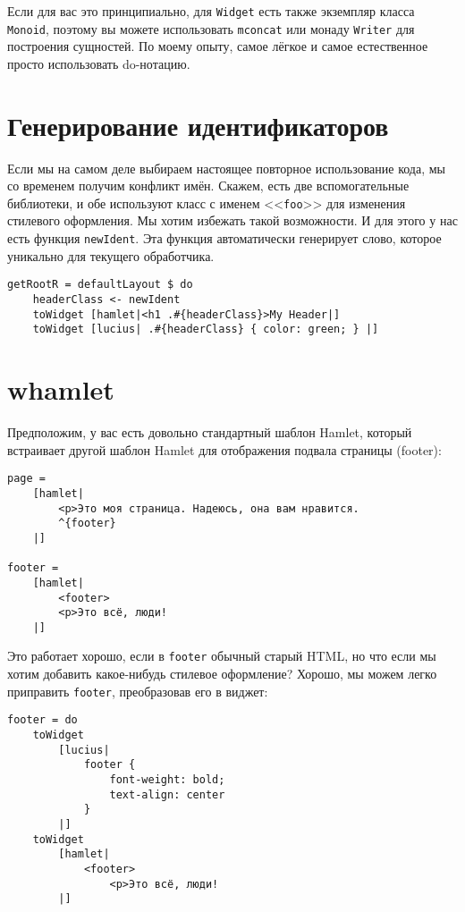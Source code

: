 \begin{remark}
    Если для вас это принципиально, для \lstinline'Widget' есть также экземпляр
    класса \lstinline'Monoid', поэтому вы можете использовать
    \lstinline'mconcat' или монаду \lstinline'Writer' для построения сущностей.
    По моему опыту, самое лёгкое и самое естественное просто использовать
    do-нотацию.
\end{remark}

\section{Генерирование идентификаторов}
Если мы на самом деле выбираем настоящее повторное использование кода, мы со
временем получим конфликт имён. Скажем, есть две вспомогательные библиотеки, и
обе используют класс с именем <<\lstinline'foo'>> для изменения стилевого
оформления. Мы хотим избежать такой возможности. И для этого у нас есть функция
\lstinline'newIdent'. Эта функция автоматически генерирует слово, которое
уникально для текущего обработчика.
\begin{lstlisting}
getRootR = defaultLayout $ do
    headerClass <- newIdent
    toWidget [hamlet|<h1 .#{headerClass}>My Header|]
    toWidget [lucius| .#{headerClass} { color: green; } |]
\end{lstlisting}

\section{whamlet}
Предположим, у вас есть довольно стандартный шаблон Hamlet, который встраивает
другой шаблон Hamlet для отображения подвала страницы (footer):
\begin{lstlisting}
page =
    [hamlet|
        <p>Это моя страница. Надеюсь, она вам нравится.
        ^{footer}
    |]

footer =
    [hamlet|
        <footer>
        <p>Это всё, люди!
    |]
\end{lstlisting}

Это работает хорошо, если в \lstinline'footer' обычный старый HTML, но что если
мы хотим добавить какое-нибудь стилевое оформление? Хорошо, мы можем легко
приправить \lstinline'footer', преобразовав его в виджет:
\begin{lstlisting}
footer = do
    toWidget
        [lucius|
            footer {
                font-weight: bold;
                text-align: center
            }
        |]
    toWidget
        [hamlet|
            <footer>
                <p>Это всё, люди!
        |]
\end{lstlisting}

